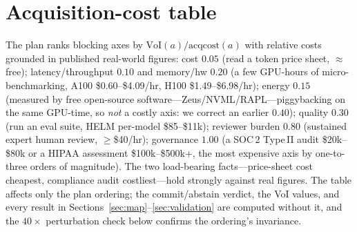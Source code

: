 \documentclass{article} %
\newcommand{\VoI}{\mathrm{VoI}}
\begin{document}
\section{Acquisition-cost table}
\label{app:acq}
The plan ranks blocking axes by $\VoI(a)/\mathrm{acqcost}(a)$ with relative costs grounded in published real-world figures: cost $0.05$ (read a token price sheet, $\approx$ free); latency/throughput $0.10$ and memory/hw $0.20$ (a few GPU-hours of micro-benchmarking, A100 \$0.60--\$4.09/hr, H100 \$1.49--\$6.98/hr); energy $0.15$ (measured by free open-source software---Zeus/NVML/RAPL---piggybacking on the same GPU-time, so \emph{not} a costly axis: we correct an earlier $0.40$); quality $0.30$ (run an eval suite, HELM per-model \$85--\$11k); reviewer burden $0.80$ (sustained expert human review, $\ge$\$40/hr); governance $1.00$ (a SOC\,2 Type\,II audit \$20k--\$80k or a HIPAA assessment \$100k--\$500k+, the most expensive axis by one-to-three orders of magnitude). The two load-bearing facts---price-sheet cost cheapest, compliance audit costliest---hold strongly against real figures. The table affects only the plan ordering; the commit/abstain verdict, the VoI values, and every result in Sections~\ref{sec:map}--\ref{sec:validation} are computed without it, and the $40\times$ perturbation check below confirms the ordering's invariance.
\end{document}
